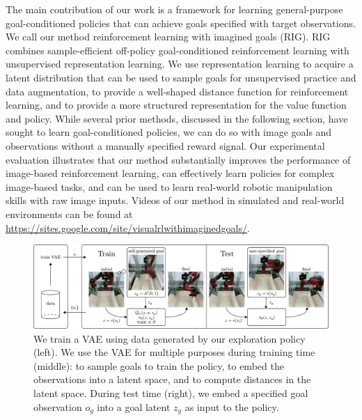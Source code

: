 The main contribution of our work is a framework for learning general-purpose goal-conditioned policies that can achieve goals specified with target observations.
We call our method reinforcement learning with imagined goals (RIG).
RIG combines sample-efficient off-policy goal-conditioned reinforcement learning with unsupervised representation learning.
We use representation learning to acquire a latent distribution that can be used to sample goals for unsupervised practice and data augmentation, to provide a well-shaped distance function for reinforcement learning, and to provide a more structured representation for the value function and policy.
While several prior methods, discussed in the following section, have sought to learn goal-conditioned policies, we can do so with image goals and observations without a manually specified reward signal.
Our experimental evaluation illustrates that our method substantially improves the performance of image-based reinforcement learning, can effectively learn policies for complex image-based tasks, and can be used to learn real-world robotic manipulation skills with raw image inputs. Videos of our method in simulated and real-world environments can be found at \url{https://sites.google.com/site/visualrlwithimaginedgoals/}.

\begin{figure}
    \centering
    \includegraphics[width=\linewidth]{rig/img/fig1-min-crop.pdf}
    \caption{We train a VAE using data generated by our exploration policy (left). We use the VAE for multiple purposes during training time (middle): to sample goals to train the policy, to embed the observations into a latent space, and to compute distances in the latent space. During test time (right), we embed a specified goal observation $o_g$ into a goal latent $z_g$ as input to the policy.}
    \vspace{-0.1in}
    \label{fig:fig1}
\end{figure}

